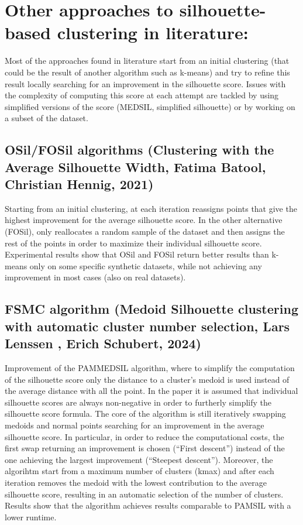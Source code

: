\documentclass{article}
\begin{document}
\section*{Other approaches to silhouette-based clustering in literature:}

Most of the approaches found in literature start from an initial clustering (that could be the result of another algorithm such as k-means) and try to refine this result locally searching for an improvement in the silhouette score. Issues with the complexity of computing this score at each attempt are tackled by using simplified versions of the score (MEDSIL, simplified silhouette) or by working on a subset of the dataset.

\subsection{\textbf{OSil/FOSil} algorithms (Clustering with the Average Silhouette Width, Fatima Batool, Christian Hennig, 2021)}

Starting from an initial clustering, at each iteration reassigns points that give the highest improvement for the average silhouette score. In the other alternative (FOSil), only reallocates a random sample of the dataset and then assigns the rest of the points in order to maximize their individual silhouette score.
Experimental results show that OSil and FOSil return better results than k-means only on some specific synthetic datasets, while not achieving any improvement in most cases (also on real datasets).

\subsection{\textbf{FSMC} algorithm (Medoid Silhouette clustering with automatic cluster number selection, Lars Lenssen , Erich Schubert, 2024)}

Improvement of the PAMMEDSIL algorithm, where to simplify the computation of the silhouette score only the distance to a cluster’s medoid is used instead of the average distance with all the point.
In the paper it is assumed that individual silhouette scores are always non-negative in order to furtherly simplify the silhouette score formula.
The core of the algorithm is still iteratively swapping medoids and normal points searching for an improvement in the average silhouette score.
In particular, in order to reduce the computational costs, the first swap returning an improvement is chosen (“First descent”) instead of the one achieving the largest improvement (“Steepest descent”).
Moreover, the algorihtm start from a maximum number of clusters (kmax) and after each iteration removes the medoid with the lowest contribution to the average silhouette score, resulting in an automatic selection of the number of clusters.
Results show that the algorithm achieves results comparable to PAMSIL with a lower runtime.
\end{document}
